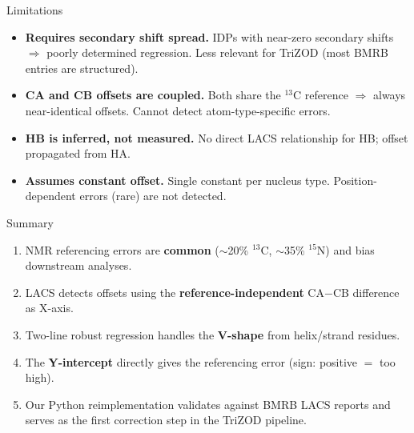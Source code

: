 \documentclass[aspectratio=169,11pt]{beamer}
\begin{document}
\begin{frame}{Limitations}

\begin{itemize}\setlength\itemsep{4pt}
  \item \textbf{Requires secondary shift spread.} IDPs with near-zero secondary shifts $\Rightarrow$ poorly determined regression. Less relevant for TriZOD (most BMRB entries are structured).

  \item \textbf{CA and CB offsets are coupled.} Both share the ${}^{13}$C reference $\Rightarrow$ always near-identical offsets. Cannot detect atom-type-specific errors.

  \item \textbf{HB is inferred, not measured.} No direct LACS relationship for HB; offset propagated from HA.

  \item \textbf{Assumes constant offset.} Single constant per nucleus type. Position-dependent errors (rare) are not detected.
\end{itemize}
\end{frame}

\begin{frame}{Summary}

\begin{enumerate}
  \item NMR referencing errors are \textbf{common} ($\sim$20\% ${}^{13}$C, $\sim$35\% ${}^{15}$N) and bias downstream analyses.

  \medskip
  \item LACS detects offsets using the \textbf{reference-independent} CA$-$CB difference as X-axis.

  \medskip
  \item Two-line robust regression handles the \textbf{V-shape} from helix/strand residues.

  \medskip
  \item The \textbf{Y-intercept} directly gives the referencing error (sign: positive $=$ too high).

  \medskip
  \item Our Python reimplementation validates against BMRB LACS reports and serves as the first correction step in the TriZOD pipeline.
\end{enumerate}
\end{frame}
\end{document}

